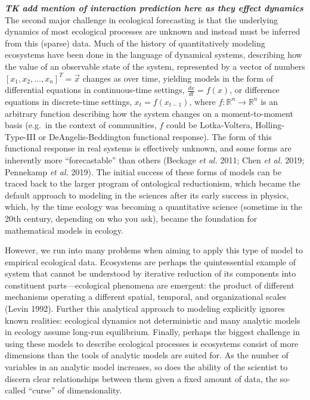 \documentclass[11pt]{article}
\begin{document}
\textbf{\emph{TK add mention of interaction prediction here as they
effect dynamics}} The second major challenge in ecological forecasting
is that the underlying dynamics of most ecological processes are unknown
and instead must be inferred from this (sparse) data. Much of the
history of quantitatively modeling ecosystems have been done in the
language of dynamical systems, describing how the value of an observable
state of the system, represented by a vector of numbers
\([x_1, x_2, \dots, x_n]^T = \vec{x}\) changes as over time, yielding
models in the form of differential equations in continuous-time
settings, \(\frac{dx}{dt} = f(x)\), or difference equations in
discrete-time settings, \(x_t = f(x_{t-1})\), where
\(f:\mathbb{R}^n \to \mathbb{R}^n\) is an arbitrary function describing
how the system changes on a moment-to-moment basis (e.g.~in the context
of communities, \(f\) could be Lotka-Voltera, Holling-Type-III or
DeAngelis-Beddington functional response). The form of this functional
response in real systems is effectively unknown, and some forms are
inherently more ``forecastable'' than others (Beckage \emph{et al.}
2011; Chen \emph{et al.} 2019; Pennekamp \emph{et al.} 2019). The
initial success of these forms of models can be traced back to the
larger program of ontological reductionism, which became the default
approach to modeling in the sciences after its early success in physics,
which, by the time ecology was becoming a quantitative science (sometime
in the 20th century, depending on who you ask), became the foundation
for mathematical models in ecology.

However, we run into many problems when aiming to apply this type of
model to empirical ecological data. Ecosystems are perhaps the
quintessential example of system that cannot be understood by iterative
reduction of its components into constituent parts---ecological
phenomena are emergent: the product of different mechanisms operating a
different spatial, temporal, and organizational scales (Levin 1992).
Further this analytical approach to modeling explicitly ignores known
realities: ecological dynamics not deterministic and many analytic
models in ecology assume long-run equilibrium. Finally, perhaps the
biggest challenge in using these models to describe ecological processes
is ecosystems consist of more dimensions than the tools of analytic
models are suited for. As the number of variables in an analytic model
increases, so does the ability of the scientist to discern clear
relationships between them given a fixed amount of data, the so-called
``curse'' of dimensionality.
\end{document}
